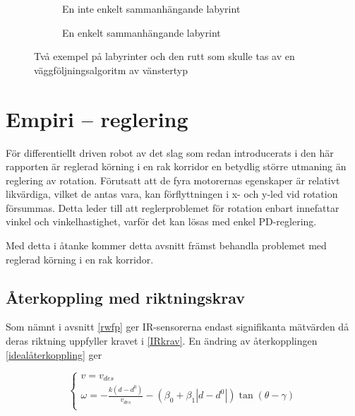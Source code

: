 \documentclass[11pt]{article}
\begin{document}
\begin{flushleft}
\begin{figure}[htbp]
	\centering
	\begin{subfigure}{.5\linewidth}
		\centering
		\noindent\resizebox{.5\textwidth}{!}{
			}
		\caption{En inte enkelt sammanhängande labyrint}	
		\label{non-connected}
	\end{subfigure}%
	\begin{subfigure}{.5\linewidth}
		\centering
		\noindent\resizebox{.5\textwidth}{!}{
			}
		\caption{En enkelt sammanhängande labyrint}	
	\end{subfigure}%
	\caption{Två exempel på labyrinter och den rutt som skulle tas av en väggföljningsalgoritm av vänstertyp}
	\label{maze}
\end{figure}%



\pagebreak
\section{Empiri -- reglering}
För differentiellt driven robot av det slag som redan introducerats i den här rapporten är reglerad körning i en rak korridor en betydlig större utmaning än reglering av rotation. Förutsatt att de fyra motorernas egenskaper är relativt likvärdiga, vilket de antas vara, kan förflyttningen i x- och y-led vid rotation försummas. Detta leder till att reglerproblemet för rotation enbart innefattar vinkel och vinkelhastighet, varför det kan lösas med enkel PD-reglering.

Med detta i åtanke kommer detta avsnitt främst behandla problemet med reglerad körning i en rak korridor. 

\subsection{Återkoppling med riktningskrav}
Som nämnt i avsnitt \ref{rwfp} ger IR-sensorerna endast signifikanta mätvärden då deras riktning uppfyller kravet i \eqref{IRkrav}. En ändring av återkopplingen \eqref{idealåterkoppling} ger

\begin{equation}\label{IRåterkoppling}
	\begin{cases}
	v = v_{des} \\
	\omega = - \frac{k(d-d^0)} {v_{des}} - (\beta_0 + \beta_1 |d - d^0|) \tan(\theta - \gamma) \\
	\end{cases}
\end{equation}


\end{flushleft}
\end{document}
